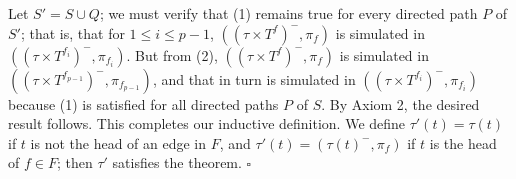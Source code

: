 Let $S' = S \cup Q$; we must verify that (1) remains true for every directed path $P$ of $S'$; that is, that for $1 \le i \le p-1$, $((\tau \times T^f)^-, \pi_f)$ is simulated in $((\tau \times T^{f_i})^-, \pi_{f_i})$. But from (2), $((\tau \times T^f)^-, \pi_f)$ is simulated in $((\tau \times T^{f_{p-1}})^-, \pi_{f_{p-1}})$, and that in turn is simulated in $((\tau \times T^{f_i})^-, \pi_{f_i})$ because (1) is satisfied for all directed paths $P$ of $S$. By Axiom 2, the desired result follows. This completes our inductive definition. We define $\tau'(t) = \tau(t)$ if $t$ is not the head of an edge in $F$, and $\tau'(t) = (\tau(t)^-, \pi_f)$ if $t$ is the head of $f \in F$; then $\tau'$ satisfies the theorem. $\square$
